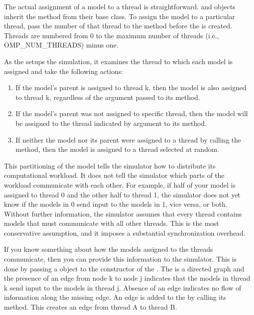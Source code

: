 The actual assignment of a model to a thread is straightforward.  and  objects inherit the  method from their  base class. To assign the model to a particular thread, pass the number of that thread to the  method before the  is created. Threads are numbered from 0 to the maximum number of threads (i.e., OMP\_NUM\_THREADS) minus one.

As the  setups the simulation, it examines the thread to which each model is assigned and take the following actions:
\begin{enumerate}
\item If the model's parent is assigned to thread k, then the model is also assigned to thread k, regardless of the argument passed to its  method.
\item If the model's parent was not assigned to specific thread, then the model will be assigned to the thread indicated by argument to its  method.
\item If neither the model nor its parent were assigned to a thread by calling the  method, then the model is assigned to a thread selected at random.
\end{enumerate}

This partitioning of the model tells the simulator how to distribute its computational workload. It does not tell the simulator which parts of the workload communicate with each other. For example, if half of your model is assigned to thread 0 and the other half to thread 1, the simulator does not yet know if the models in 0 send input to the models in 1, vice versa, or both. Without further information, the simulator assumes that every thread contains models that must communicate with all other threads. This is the most conservative assumption, and it imposes a substantial synchronization overhead.

If you know something about how the models assigned to the threads communicate, then you can provide this information to the simulator. This is done by passing a  object to the constructor of the . The  is a directed graph and the presence of an edge from node k to node j indicates that the models in thread k send input to the models in thread j. Absence of an edge indicates no flow of information along the missing edge. An edge is added to the  by calling its  method. This creates an edge from thread A to thread B.


